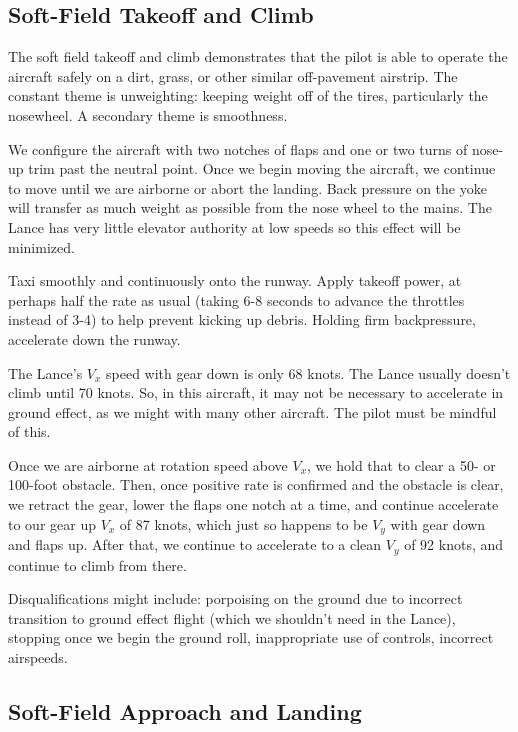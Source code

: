 \subsection{Soft-Field Takeoff and Climb}

The soft field takeoff and climb demonstrates that the pilot is able to operate the aircraft safely on a dirt, grass, or other similar off-pavement airstrip. The constant theme is unweighting: keeping weight off of the tires, particularly the nosewheel. A secondary theme is smoothness.

We configure the aircraft with two notches of flaps and one or two turns of nose-up trim past the neutral point. Once we begin moving the aircraft, we continue to move until we are airborne or abort the landing. Back pressure on the yoke will transfer as much weight as possible from the nose wheel to the mains. The Lance has very little elevator authority at low speeds so this effect will be minimized.

Taxi smoothly and continuously onto the runway. Apply takeoff power, at perhaps half the rate as usual (taking 6-8 seconds to advance the throttles instead of 3-4) to help prevent kicking up debris. Holding firm backpressure, accelerate down the runway.

The Lance's $V_x$ speed with gear down is only 68 knots. The Lance usually doesn't climb until 70 knots. So, in this aircraft, it may not be necessary to accelerate in ground effect, as we might with many other aircraft. The pilot must be mindful of this.

Once we are airborne at rotation speed above $V_x$, we hold that to clear a 50- or 100-foot obstacle. Then, once positive rate is confirmed and the obstacle is clear, we retract the gear, lower the flaps one notch at a time, and continue accelerate to our gear up $V_x$ of 87 knots, which just so happens to be $V_y$ with gear down and flaps up. After that, we continue to accelerate to a clean $V_y$ of 92 knots, and continue to climb from there.

Disqualifications might include: porpoising on the ground due to incorrect transition to ground effect flight (which we shouldn't need in the Lance), stopping once we begin the ground roll, inappropriate use of controls, incorrect airspeeds.

\subsection{Soft-Field Approach and Landing}

